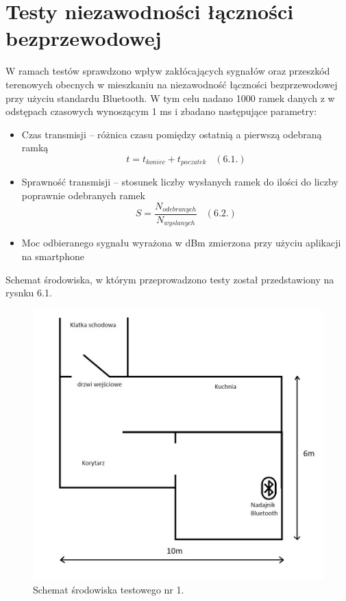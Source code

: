 \documentclass[12pt, twoside, openany]{mwrep}
\begin{document}
\section{Testy niezawodności łączności bezprzewodowej}
W ramach testów sprawdzono wpływ zakłócających sygnałów oraz przeszkód terenowych obecnych w mieszkaniu na niezawodność łączności bezprzewodowej przy użyciu standardu Bluetooth. W tym celu nadano 1000 ramek danych z w odstępach czasowych wynoszącym 1 ms i zbadano następujące parametry:

\begin{itemize}
\item Czas transmisji – różnica czasu pomiędzy ostatnią a pierwszą odebraną ramką \[ t = t_{koniec} + t_{poczatek} \; \; \;  (6.1.)\]
\item	Sprawność transmisji – stosunek liczby wysłanych ramek do ilości do liczby poprawnie odebranych ramek \[ S = \frac{N_{odebranych}}{N_{wyslanych}} \; \; \;  (6.2.)\]
\item	Moc odbieranego sygnału wyrażona w dBm zmierzona przy użyciu aplikacji na smartphone 
\end{itemize}
Schemat środowiska, w którym przeprowadzono testy został przedstawiony na rysnku 6.1.
\begin{figure}[H]
\centering
\includegraphics[scale=0.6]{mieszkanke}
\caption{Schemat środowiska testowego nr 1.}
\end{figure}
\end{document}
